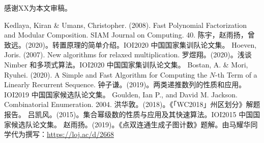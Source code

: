 感谢XX为本文审稿。

\begin{thebibliography}{99}
 Kedlaya, Kiran \& Umans, Christopher. (2008). Fast Polynomial Factorization and Modular Composition. SIAM Journal on Computing. 40. 
 陈宇，赵雨扬，曾致远。(2020)。转置原理的简单介绍。IOI2020 中国国家集训队论文集。
 Hoeven, Joris. (2007). New algorithms for relaxed multiplication.  
 罗煜翔。(2020)。浅谈 Nimber 和多项式算法。IOI2020 中国国家集训队论文集。
 Bostan, A. \& Mori, Ryuhei. (2020). A Simple and Fast Algorithm for Computing the $N$-th Term of a Linearly Recurrent Sequence. 
 钟子谦。(2019)。两类递推数列的性质和应用。IOI2019 中国国家候选队论文集。
 Goulden, Ian P., and David M. Jackson. Combinatorial Enumeration. 2004.
 洪华敦。(2018)。《「WC2018」州区划分》解题报告。
 吕凯风。(2015)。集合幂级数的性质与应用及其快速算法。IOI2015 中国国家候选队论文集。
 赵雨扬。(2019)。《点双连通生成子图计数》题解。由马耀华同学代为撰写：\url{https://loj.ac/d/2668}
\end{thebibliography}
